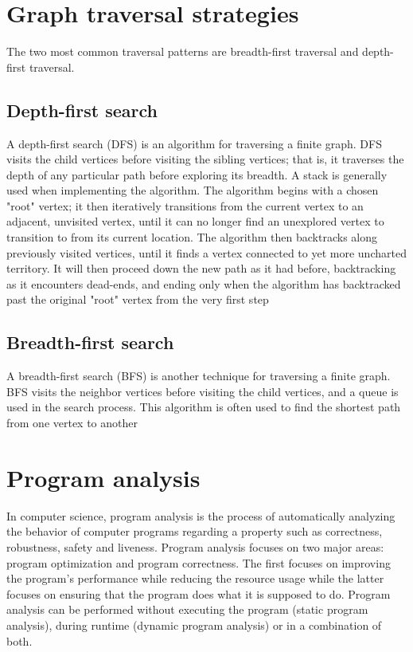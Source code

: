 \section{Graph traversal strategies}
The two most common traversal patterns are breadth-first traversal and depth-first traversal.

\subsection{Depth-first search}
A depth-first search (DFS) is an algorithm for traversing a finite graph. DFS visits the child vertices before visiting the sibling vertices; that is, it traverses the depth of any particular path before exploring its breadth. A stack is generally used when implementing the algorithm.
The algorithm begins with a chosen "root" vertex; it then iteratively transitions from the current vertex to an adjacent, unvisited vertex, until it can no longer find an unexplored vertex to transition to from its current location. The algorithm then backtracks along previously visited vertices, until it finds a vertex connected to yet more uncharted territory. It will then proceed down the new path as it had before, backtracking as it encounters dead-ends, and ending only when the algorithm has backtracked past the original "root" vertex from the very first step

\subsection{Breadth-first search}
A breadth-first search (BFS) is another technique for traversing a finite graph. BFS visits the neighbor vertices before visiting the child vertices, and a queue is used in the search process. This algorithm is often used to find the shortest path from one vertex to another

\section{Program analysis}
In computer science, program analysis is the process of automatically analyzing the behavior of computer programs regarding a property such as correctness, robustness, safety and liveness. Program analysis focuses on two major areas: program optimization and program correctness. The first focuses on improving the program’s performance while reducing the resource usage while the latter focuses on ensuring that the program does what it is supposed to do. Program analysis can be performed without executing the program (static program analysis), during runtime (dynamic program analysis) or in a combination of both.

